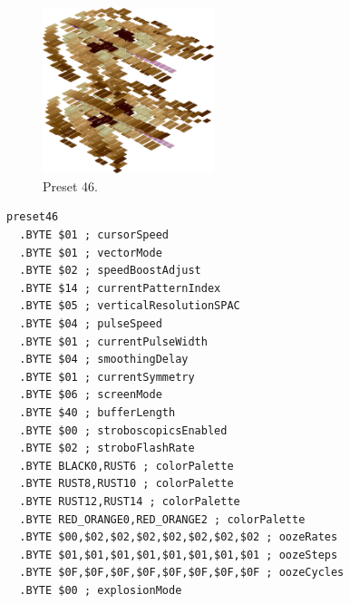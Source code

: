 \begin{minipage}[b]{0.48\linewidth}
\begin{figure}[H]                                                          
  \centering                                                             
  \begin{adjustbox}{width=5cm,center}                                   
  \includegraphics[width=5cm]{src/colorspace_presets/preset46-45.png}%
  \end{adjustbox}                                                        
\caption*{Preset 46.}                                           
\end{figure}                                                               
\end{minipage}
\hspace{0.1cm}
\begin{minipage}[b]{0.48\linewidth}                                       
\begin{lstlisting}[basicstyle=\ttfamily\tiny]
preset46
  .BYTE $01 ; cursorSpeed
  .BYTE $01 ; vectorMode
  .BYTE $02 ; speedBoostAdjust
  .BYTE $14 ; currentPatternIndex
  .BYTE $05 ; verticalResolutionSPAC
  .BYTE $04 ; pulseSpeed
  .BYTE $01 ; currentPulseWidth
  .BYTE $04 ; smoothingDelay
  .BYTE $01 ; currentSymmetry
  .BYTE $06 ; screenMode
  .BYTE $40 ; bufferLength
  .BYTE $00 ; stroboscopicsEnabled
  .BYTE $02 ; stroboFlashRate
  .BYTE BLACK0,RUST6 ; colorPalette
  .BYTE RUST8,RUST10 ; colorPalette
  .BYTE RUST12,RUST14 ; colorPalette
  .BYTE RED_ORANGE0,RED_ORANGE2 ; colorPalette
  .BYTE $00,$02,$02,$02,$02,$02,$02,$02 ; oozeRates
  .BYTE $01,$01,$01,$01,$01,$01,$01,$01 ; oozeSteps
  .BYTE $0F,$0F,$0F,$0F,$0F,$0F,$0F,$0F ; oozeCycles
  .BYTE $00 ; explosionMode
\end{lstlisting}
\end{minipage}

\vspace*{1.5cm}

